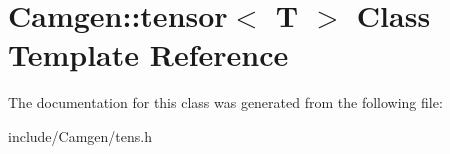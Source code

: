 \hypertarget{a00541}{}\section{Camgen\+:\+:tensor$<$ T $>$ Class Template Reference}
\label{a00541}


The documentation for this class was generated from the following file\+:\begin{DoxyCompactItemize}
\item 
include/\+Camgen/tens.\+h\end{DoxyCompactItemize}
